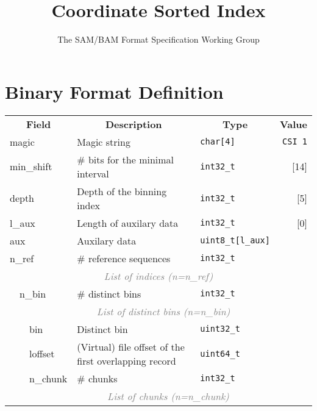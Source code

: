 \documentclass[10pt]{article}
\begin{document}
\title{Coordinate Sorted Index}
\author{The SAM/BAM Format Specification Working Group}
\maketitle

\section{Binary Format Definition}
\begin{table}[ht]
{\small
\begin{tabular}{|l|l|l|l|l|l|r|}
  \cline{1-7}
  \multicolumn{4}{|c|}{\bf Field} & \multicolumn{1}{c|}{\bf Description} & \multicolumn{1}{c|}{\bf Type} & \multicolumn{1}{c|}{\bf Value} \\\cline{1-7}
  \multicolumn{4}{|l|}{\sf magic} & Magic string & {\tt char[4]} & {\tt CSI\char92 1}\\\cline{1-7}
  \multicolumn{4}{|l|}{\sf min\_shift} & \# bits for the minimal interval & {\tt int32\_t} & [14]\\\cline{1-7}
  \multicolumn{4}{|l|}{\sf depth} & Depth of the binning index & {\tt int32\_t} & [5]\\\cline{1-7}
  \multicolumn{4}{|l|}{\sf l\_aux} & Length of auxilary data & {\tt int32\_t} & [0]\\\cline{1-7}
  \multicolumn{4}{|l|}{\sf aux} & Auxilary data & {\tt uint8\_t[l\_aux]} & \\\cline{1-7}
  \multicolumn{4}{|l|}{\sf n\_ref} & \# reference sequences & {\tt int32\_t} & \\\cline{1-7}
  \multicolumn{7}{|c|}{\textcolor{gray}{\it List of indices (n=n\_ref)}} \\\cline{2-7}
  & \multicolumn{3}{l|}{\sf n\_bin} & \# distinct bins & {\tt int32\_t} & \\\cline{2-7}
  & \multicolumn{6}{c|}{\textcolor{gray}{\it List of distinct bins (n=n\_bin)}} \\\cline{3-7}
  & & \multicolumn{2}{l|}{\sf bin} & Distinct bin & {\tt uint32\_t} & \\\cline{3-7}
  & & \multicolumn{2}{l|}{\sf loffset} & (Virtual) file offset of the first overlapping record & {\tt uint64\_t} & \\\cline{3-7}
  & & \multicolumn{2}{l|}{\sf n\_chunk} & \# chunks & {\tt int32\_t} & \\\cline{3-7}
  & & \multicolumn{5}{c|}{\textcolor{gray}{\it List of chunks (n=n\_chunk)}} \\\cline{4-7}

\end{tabular}}
\end{table}
\end{document}
